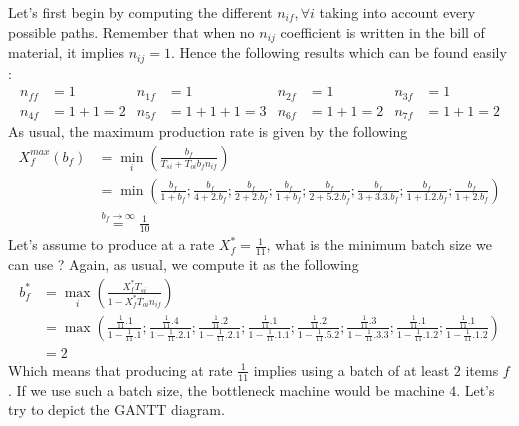 Let's first begin by computing the different $n_{if}, \forall i$ taking into account every possible paths. Remember that when no $n_{ij}$ coefficient is written in the bill of material, it implies $n_{ij} = 1$. Hence the following results which can be found easily : 
\begin{align*}
    n_{ff} &= 1 & n_{1f} &= 1 & n_{2f} &= 1 & n_{3f} &= 1 \\
    n_{4f} &= 1+1 = 2 & n_{5f} &= 1+1+1 = 3 & n_{6f} &= 1+1=2 & n_{7f} &= 1+1 = 2
\end{align*}
As usual, the maximum production rate is given by the following 
\[
    \begin{split}
    X_f^{max}(b_f) &= \min_i\left( \frac{b_f}{T_{si} + T_{oi}b_fn_{if}} \right) \\
    &=
    \min\left(
        \frac{b_f}{1+b_f} ; 
        \frac{b_f}{4+2.b_f} ; 
        \frac{b_f}{2+2.b_f} ; 
        \frac{b_f}{1+b_f} ; 
        \frac{b_f}{2+5.2.b_f} ; 
        \frac{b_f}{3+3.3.b_f} ; 
        \frac{b_f}{1+1.2.b_f} ; 
        \frac{b_f}{1+2.b_f}
    \right)\\
    & \overset{b_f\rightarrow\infty}{=}
    \frac{1}{10}
    \end{split}
\]
Let's assume to produce at a rate $X_f^* = \frac{1}{11}$, what is the minimum batch size we can use ? Again, as usual, we compute it as the following
\begin{align*}
    b_f^* &= \max_i\left( \frac{X_f^*T_{si}}{1-X_f^*T_{oi}n_{if}} \right)\\
    &= \max\left(
        \frac{ \frac{1}{11}.1 }{ 1 - \frac{1}{11}.1 } ;
        \frac{ \frac{1}{11}.4 }{ 1 - \frac{1}{11}.2.1 } ;
        \frac{ \frac{1}{11}.2 }{ 1 - \frac{1}{11}.2.1 } ;
        \frac{ \frac{1}{11}.1 }{ 1 - \frac{1}{11}.1.1 } ;
        \frac{ \frac{1}{11}.2 }{ 1 - \frac{1}{11}.5.2 } ;
        \frac{ \frac{1}{11}.3 }{ 1 - \frac{1}{11}.3.3 } ;
        \frac{ \frac{1}{11}.1 }{ 1 - \frac{1}{11}.1.2 } ;
        \frac{ \frac{1}{11}.1 }{ 1 - \frac{1}{11}.1.2 }
    \right)\\
    &= 2
\end{align*}
Which means that producing at rate $\frac{1}{11}$ implies using a batch of at least $2$ items $f$. If we use such a batch size, the bottleneck machine would be machine $4$. Let's try to depict the GANTT diagram.

